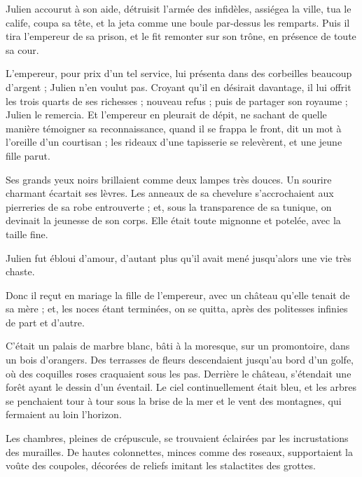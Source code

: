 \documentclass[]{book}
\begin{document}
                Julien accourut à son aide, détruisit l'armée des infidèles, assiégea la ville, tua le calife, coupa sa tête, et la jeta comme une boule par-dessus les remparts. Puis il tira l'empereur de sa prison, et le fit remonter sur son trône, en présence de toute sa cour.
                    
                L'empereur, pour prix d'un tel service, lui présenta dans des corbeilles beaucoup d'argent ; Julien n'en voulut pas. Croyant qu'il en désirait davantage, il lui offrit les trois quarts de ses richesses ; nouveau refus ; puis de partager son royaume ; Julien le remercia. Et l'empereur en pleurait de dépit, ne sachant de quelle manière témoigner sa reconnaissance, quand il se frappa le front, dit un mot à l'oreille d'un courtisan ; les rideaux d'une tapisserie se relevèrent, et une jeune fille parut.
                    
                Ses grands yeux noirs brillaient comme deux lampes très douces. Un sourire charmant écartait ses lèvres. Les anneaux de sa chevelure s'accrochaient aux pierreries de sa robe entrouverte ; et, sous la transparence de sa tunique, on devinait la jeunesse de son corps. Elle était toute mignonne et potelée, avec la taille fine.
                    
                Julien fut ébloui d'amour, d'autant plus qu'il avait mené jusqu'alors une vie très chaste.
                    
                Donc il reçut en mariage la fille de l'empereur, avec un château qu'elle tenait de sa mère ; et, les noces étant terminées, on se quitta, après des politesses infinies de part et d'autre.
                    
                C'était un palais de marbre blanc, bâti à la moresque, sur un promontoire, dans un bois d'orangers. Des terrasses de fleurs descendaient jusqu'au bord d'un golfe, où des coquilles roses craquaient sous les pas. Derrière le château, s'étendait une forêt ayant le dessin d'un éventail. Le ciel continuellement était bleu, et les arbres se penchaient tour à tour sous la brise de la mer et le vent des montagnes, qui fermaient au loin l'horizon.
                    
                Les chambres, pleines de crépuscule, se trouvaient éclairées par les incrustations des murailles. De hautes colonnettes, minces comme des roseaux, supportaient la voûte des coupoles, décorées de reliefs imitant les stalactites des grottes.
                    
\end{document}

